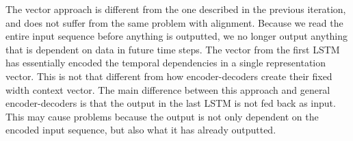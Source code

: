 The vector approach is different from the one described in the previous iteration, and does not suffer from the same problem with alignment. Because we read the entire input sequence before anything is outputted, we no longer output anything that is dependent on data in future time steps. The vector from the first LSTM has essentially encoded the temporal dependencies in a single representation vector. This is not that different from how encoder-decoders create their fixed width context vector. The main difference between this approach and general encoder-decoders is that the output in the last LSTM is not fed back as input. This may cause problems because the output is not only dependent on the encoded input sequence, but also what it has already outputted.